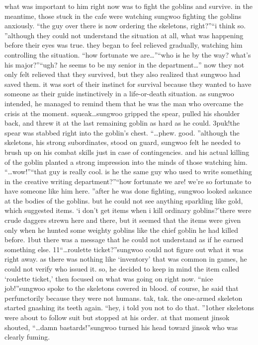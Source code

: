  what was important to him right now was to fight the goblins and survive.
in the meantime, those stuck in the cafe were watching sungwoo fighting the goblins anxiously.
“the guy over there is now ordering the skeletons, right?”“i think so.
”although they could not understand the situation at all, what was happening before their eyes was true.
 they began to feel relieved gradually, watching him controlling the situation.
“how fortunate we are…”“who is he by the way? what’s his major?”“ugh? he seems to be my senior in the department…”
now they not only felt relieved that they survived, but they also realized that sungwoo had saved them.
 it was sort of their instinct for survival because they wanted to have someone as their guide instinctively in a life-or-death situation.
as sungwoo intended, he managed to remind them that he was the man who overcame the crisis at the moment.
squeak…sungwoo gripped the spear, pulled his shoulder back, and threw it at the last remaining goblin as hard as he could.
3puk!the spear was stabbed right into the goblin’s chest.
“…phew.
 good.
”although the skeletons, his strong subordinates, stood on guard, sungwoo felt he needed to brush up on his combat skills just in case of contingencies.
 and his actual killing of the goblin planted a strong impression into the minds of those watching him.
“…wow!”“that guy is really cool.
 is he the same guy who used to write something in the creative writing department?”“how fortunate we are! we’re so fortunate to have someone like him here.
”after he was done fighting, sungwoo looked askance at the bodies of the goblins.
 but he could not see anything sparkling like gold, which suggested items.
‘i don’t get items when i kill ordinary goblins?’there were crude daggers strewn here and there, but it seemed that the items were given only when he hunted some weighty goblins like the chief goblin he had killed before.
1but there was a message that he could not understand as if he earned something else.
11“…roulette ticket?”sungwoo could not figure out what it was right away.
 as there was nothing like ‘inventory’ that was common in games, he could not verify who issued it.
 so, he decided to keep in mind the item called ‘roulette ticket,’ then focused on what was going on right now.
“nice job!”sungwoo spoke to the skeletons covered in blood.
of course, he said that perfunctorily because they were not humans.
tak, tak.
the one-armed skeleton started gnashing its teeth again.
“hey, i told you not to do that.
”1other skeletons were about to follow suit but stopped at his order.
at that moment jinsok shouted, “…damn bastards!”sungwoo turned his head toward jinsok who was clearly fuming.
